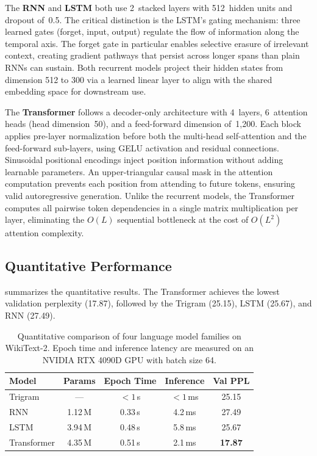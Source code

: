 \documentclass[10pt,a4paper]{article}
\begin{document}
The \textbf{RNN} and \textbf{LSTM} both use 2~stacked layers with 512~hidden units and dropout of~0.5. The critical distinction is the LSTM's gating mechanism: three learned gates (forget, input, output) regulate the flow of information along the temporal axis. The forget gate in particular enables selective erasure of irrelevant context, creating gradient pathways that persist across longer spans than plain RNNs can sustain. Both recurrent models project their hidden states from dimension 512 to 300 via a learned linear layer to align with the shared embedding space for downstream use.

The \textbf{Transformer} follows a decoder-only architecture with 4~layers, 6~attention heads (head dimension~50), and a feed-forward dimension of~1{,}200. Each block applies pre-layer normalization before both the multi-head self-attention and the feed-forward sub-layers, using GELU activation and residual connections. Sinusoidal positional encodings inject position information without adding learnable parameters. An upper-triangular causal mask in the attention computation prevents each position from attending to future tokens, ensuring valid autoregressive generation. Unlike the recurrent models, the Transformer computes all pairwise token dependencies in a single matrix multiplication per layer, eliminating the $O(L)$ sequential bottleneck at the cost of $O(L^2)$ attention complexity.

\subsection{Quantitative Performance}
\label{sec:quant}

 summarizes the quantitative results. The Transformer achieves the lowest validation perplexity (17.87), followed by the Trigram (25.15), LSTM (25.67), and RNN (27.49).

\begin{table}[htbp]
\centering
\caption{Quantitative comparison of four language model families on WikiText-2. Epoch time and inference latency are measured on an NVIDIA RTX 4090D GPU with batch size 64.}
\label{tab:lm_comparison}
\small
\renewcommand{\arraystretch}{1.05}
\begin{tabular}{@{}lcccc@{}}
\toprule
\textbf{Model} & \textbf{Params} & \textbf{Epoch Time} & \textbf{Inference} & \textbf{Val PPL} \\
\midrule
Trigram         & ---      & $< 1$\,s & $< 1$\,ms & 25.15 \\
RNN             & 1.12\,M  & 0.33\,s  & 4.2\,ms   & 27.49 \\
LSTM            & 3.94\,M  & 0.48\,s  & 5.8\,ms   & 25.67 \\
Transformer     & 4.35\,M  & 0.51\,s  & 2.1\,ms   & \textbf{17.87} \\
\bottomrule
\end{tabular}
\end{table}
\end{document}
